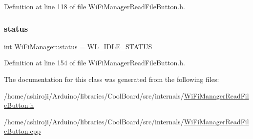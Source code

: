 Definition at line 118 of file Wi\+Fi\+Manager\+Read\+File\+Button.\+h.

\mbox{\label{class_wi_fi_manager_acceea0054a30c18809b34151d4e9eb0b}} 
\subsubsection{\texorpdfstring{status}{status}}
{\footnotesize\ttfamily int Wi\+Fi\+Manager\+::status = W\+L\+\_\+\+I\+D\+L\+E\+\_\+\+S\+T\+A\+T\+US\hspace{0.3cm}{\ttfamily [private]}}



Definition at line 154 of file Wi\+Fi\+Manager\+Read\+File\+Button.\+h.



The documentation for this class was generated from the following files\+:\begin{DoxyCompactItemize}
\item 
/home/ashiroji/\+Arduino/libraries/\+Cool\+Board/src/internals/\hyperlink{_wi_fi_manager_read_file_button_8h}{Wi\+Fi\+Manager\+Read\+File\+Button.\+h}\item 
/home/ashiroji/\+Arduino/libraries/\+Cool\+Board/src/internals/\hyperlink{_wi_fi_manager_read_file_button_8cpp}{Wi\+Fi\+Manager\+Read\+File\+Button.\+cpp}\end{DoxyCompactItemize}
